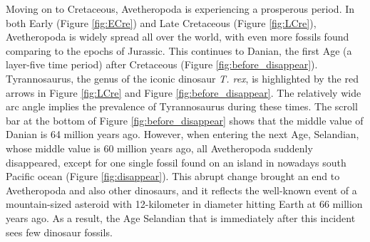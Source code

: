 \documentclass[11pt, a4paper,oneside,chapterprefix=false]{scrbook}
\begin{document}
Moving on to Cretaceous, Avetheropoda is experiencing a prosperous period. In both Early (Figure \ref{fig:ECre}) and Late Cretaceous (Figure \ref{fig:LCre}), Avetheropoda is widely spread all over the world, with even more fossils found comparing to the epochs of Jurassic. This continues to Danian, the first Age (a layer-five time period) after Cretaceous (Figure \ref{fig:before_disappear}). Tyrannosaurus, the genus of the iconic dinosaur \emph{T. rex}, is highlighted by the red arrows in Figure \ref{fig:LCre} and Figure \ref{fig:before_disappear}. The relatively wide arc angle implies the prevalence of Tyrannosaurus during these times. The scroll bar at the bottom of Figure \ref{fig:before_disappear} shows that the middle value of Danian is 64 million years ago. However, when entering the next Age, Selandian, whose middle value is 60 million years ago, all Avetheropoda suddenly disappeared, except for one single fossil found on an island in nowadays south Pacific ocean (Figure \ref{fig:disappear}). This abrupt change brought an end to Avetheropoda and also other dinosaurs, and it reflects the well-known event of a mountain-sized asteroid with 12-kilometer in diameter hitting Earth at 66 million years ago. As a result, the Age Selandian that is immediately after this incident sees few dinosaur fossils. \\
\end{document}
